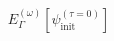\documentclass[preview]{standalone}
\begin{document}
\begin{align*}
E_{\Gamma}^{(\omega)}[{\psi}_{\text{init}}^{(\tau=0)}]
\end{align*}
\end{document}
